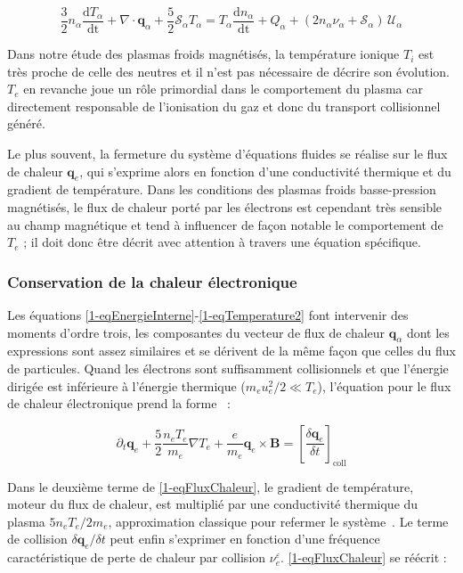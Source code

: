 \begin{refsection}
\begin{equation}
\label{1-eqTemperature2}
\frac{3}{2}n_\alpha\frac{\text{d}T_\alpha}{\text{dt}}+\nabla\cdot\mathbf
q_\alpha + \frac{5}{2}\mathcal{S}_\alpha T_\alpha =
T_\alpha\frac{\text{d}n_\alpha}{\text{dt}}+
{Q_\alpha}+(2n_\alpha\nu_\alpha+\mathcal{S}_\alpha)\,\mathcal{U}_\alpha
\end{equation}

Dans notre étude des plasmas froids magnétisés, la température ionique $T_i$
est très proche de celle des neutres et il n'est pas nécessaire de décrire
son évolution. $T_e$ en revanche joue un rôle primordial dans le comportement
du plasma car directement responsable de l'ionisation du gaz et donc du
transport collisionnel généré. 

Le plus souvent, la fermeture du système d'équations fluides se réalise sur le
flux de chaleur $\mathbf q_e$, qui s'exprime alors en fonction d'une
conductivité thermique et du gradient de température. Dans les conditions des plasmas froids
basse-pression magnétisés, le flux de chaleur porté par les électrons est
cependant très sensible au champ magnétique et tend à influencer de façon
notable le comportement de $T_e$ ; il doit donc être décrit avec attention à
travers une équation spécifique.

\subsubsection{Conservation de la chaleur électronique}

Les équations \eqref{1-eqEnergieInterne}-\eqref{1-eqTemperature2} font
intervenir des moments d'ordre trois, les composantes du vecteur de flux de
chaleur $\mathbf q_\alpha$ dont les expressions sont assez similaires et se
dérivent de la même façon que celles du flux de particules. Quand les électrons
sont suffisamment collisionnels et que l'énergie dirigée est inférieure à
l'énergie thermique ($m_eu_e^2/2\ll T_e$), l'équation pour le flux de chaleur
électronique prend la forme~\parencite{Golant} :

\begin{equation}
\label{1-eqFluxChaleur}
\partial_t\mathbf
q_e+\frac{5}{2}\frac{n_e
T_e}{m_e}\nabla T_e+\frac{e}{m_e} \mathbf
q_e\times\mathbf B=\left[\frac{\delta\mathbf q_e}{\delta t}\right]_\text{coll}
\end{equation}

Dans le deuxième terme de \eqref{1-eqFluxChaleur}, le
gradient de température, moteur du flux de chaleur, est multiplié par une
conductivité thermique du plasma $5n_eT_e/2m_e$, approximation classique pour
refermer le système~\parencite{bittencourt}. Le terme de collision
$\delta\mathbf q_e/\delta t$ peut enfin s'exprimer en fonction d'une fréquence
caractéristique de perte de chaleur par collision $\nu_{e}^\varepsilon$.
\eqref{1-eqFluxChaleur} se réécrit :


\end{refsection}
